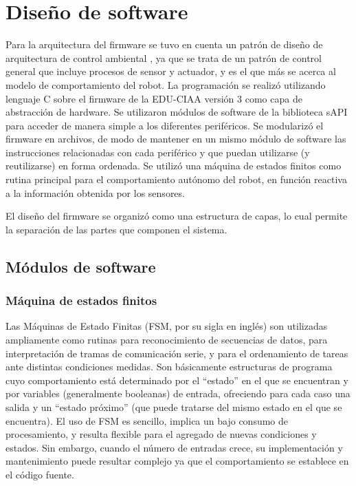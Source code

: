 

\section{Diseño de software}

Para la arquitectura del firmware se tuvo en cuenta un patrón de diseño de arquitectura de control ambiental \citep{arq}, ya que se trata de un patrón de control general que incluye procesos de sensor y actuador, y es el que más se acerca al modelo de comportamiento del robot.
La programación se realizó utilizando lenguaje C sobre el firmware de la EDU-CIAA versión 3 como capa de abstracción de hardware. 
Se utilizaron módulos de software de la biblioteca sAPI para acceder de manera simple a los diferentes periféricos.
Se modularizó el firmware en archivos, de modo de mantener en un mismo módulo de software las instrucciones relacionadas con cada periférico y que puedan utilizarse (y reutilizarse) en forma ordenada. 
Se utilizó una máquina de estados finitos como rutina principal para el comportamiento autónomo del robot, en función reactiva a la información obtenida por los sensores.

%
El diseño del firmware se organizó como una estructura de capas, lo cual permite la separación de las partes que componen el sistema.

\subsection{Módulos de software}

		\subsubsection{Máquina de estados finitos}
Las Máquinas de Estado Finitas (FSM, por su sigla en inglés) son utilizadas ampliamente como rutinas para reconocimiento de secuencias de datos, para interpretación de tramas de comunicación serie, y para el ordenamiento de tareas ante distintas condiciones medidas. Son básicamente estructuras de programa cuyo comportamiento está determinado por el “estado” en el que se encuentran y por variables (generalmente booleanas) de entrada, ofreciendo para cada caso una salida y un “estado próximo” (que puede tratarse del mismo estado en el que se encuentra).
El uso de FSM es sencillo, implica un bajo consumo de procesamiento, y resulta flexible para el agregado de nuevas condiciones y estados. Sin embargo, cuando el número de entradas crece, su implementación y mantenimiento puede resultar complejo ya que el comportamiento se establece en el código fuente.

